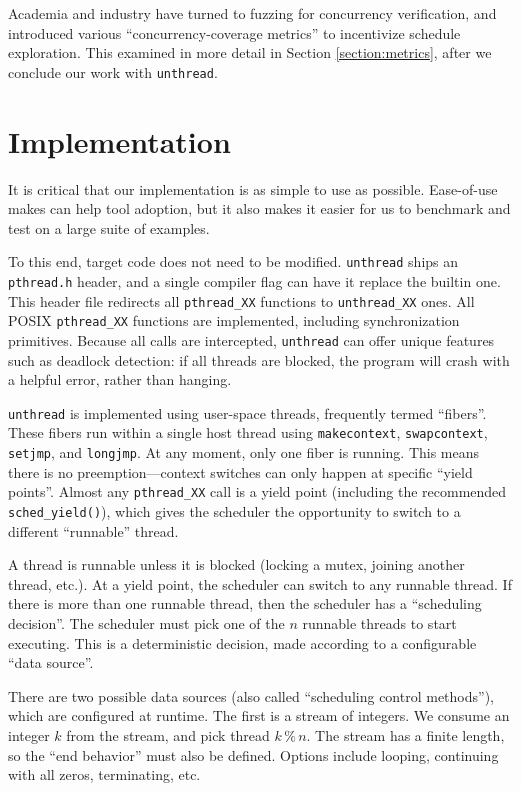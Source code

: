 \documentclass{article}
\begin{document}
Academia and industry have turned to fuzzing for concurrency verification, and introduced various ``concurrency-coverage metrics'' to incentivize schedule exploration. This examined in more detail in Section \ref{section:metrics}, after we conclude our work with \texttt{unthread}.

\fussy

\section{Implementation}

It is critical that our implementation is as simple to use as possible. Ease-of-use makes can help tool adoption, but it also makes it easier for us to benchmark and test on a large suite of examples.

To this end, target code does not need to be modified. \texttt{unthread} ships an \texttt{pthread.h} header, and a single compiler flag can have it replace the builtin one. This header file redirects all \texttt{pthread\_XX} functions to \texttt{unthread\_XX} ones. All POSIX \texttt{pthread\_XX} functions are implemented, including synchronization primitives. Because all calls are intercepted, \texttt{unthread} can offer unique features such as deadlock detection: if all threads are blocked, the program will crash with a helpful error, rather than hanging.

\texttt{unthread} is implemented using user-space threads, frequently termed ``fibers''. These fibers run within a single host thread using \texttt{makecontext}, \texttt{swapcontext}, \texttt{setjmp}, and \texttt{longjmp}. At any moment, only one fiber is running. This means there is no preemption---context switches can only happen at specific ``yield points''. Almost any \texttt{pthread\_XX} call is a yield point (including the recommended \texttt{sched\_yield()}), which gives the scheduler the opportunity to switch to a different ``runnable'' thread.

A thread is runnable unless it is blocked (locking a mutex, joining another thread, etc.). At a yield point, the scheduler can switch to any runnable thread. If there is more than one runnable thread, then the scheduler has a ``scheduling decision''. The scheduler must pick one of the $n$ runnable threads to start executing. This is a deterministic decision, made according to a configurable ``data source''.

There are two possible data sources (also called ``scheduling control methods''), which are configured at runtime. The first is a stream of integers.  We consume an integer $k$ from the stream, and pick thread $k\,\%\,n$. The stream has a finite length, so the ``end behavior'' must also be defined. Options include looping, continuing with all zeros, terminating, etc.
\end{document}
